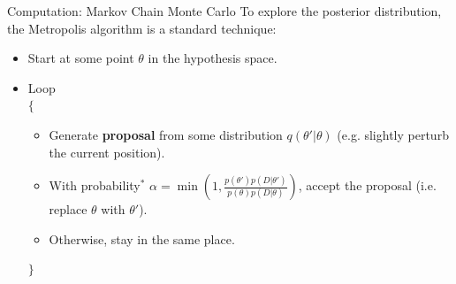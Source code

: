 \begin{frame}[t]{Computation: Markov Chain Monte Carlo}
To explore the posterior distribution, the Metropolis algorithm is a standard
technique:

\begin{itemize}
\item Start at some point $\theta$ in the hypothesis space.
\item Loop\\
$\{$
  \begin{itemize}
  \item Generate {\bf proposal} from some distribution $q(\theta' | \theta)$
  (e.g. slightly perturb the current position).
  \item With probability$^*$ $\alpha = \min\left(1, \frac{p(\theta')p(D|\theta')}{p(\theta)p(D|\theta)}\right)$, accept the proposal (i.e. replace $\theta$ with $\theta'$).
  \item Otherwise, stay in the same place.
  \end{itemize}
$\}$
\end{itemize}
\end{frame}


